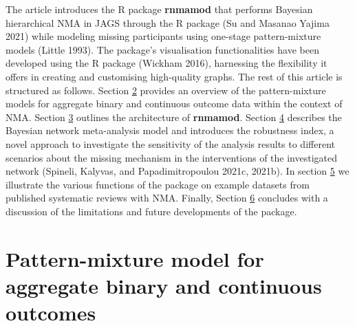 The article introduces the R package \textbf{rnmamod} that performs Bayesian
hierarchical NMA in JAGS through the R package  (Su and Masanao Yajima 2021)
while modeling missing participants using one-stage pattern-mixture models (Little 1993).
The package's visualisation functionalities have been developed using the R package
 (Wickham 2016), harnessing the flexibility it offers in creating
and customising high-quality graphs. The rest of this article is structured as
follows. Section \protect\hyperlink{Pattern-mixture-models-for-aggregate-binary-and-continuous-outcomes}{2}
provides an overview of the pattern-mixture models for aggregate binary and continuous
outcome data within the context of NMA. Section \protect\hyperlink{The-architecture-of-ux2fpkgux5cux257Brnmamodux5cux257D}{3}
outlines the architecture of \textbf{rnmamod}. Section \protect\hyperlink{Bayesian-network-meta-analysis-model}{4}
describes the Bayesian network meta-analysis model and introduces the robustness
index, a novel approach to investigate the sensitivity of the analysis results to
different scenarios about the missing mechanism in the interventions of the investigated
network (Spineli, Kalyvas, and Papadimitropoulou 2021c, 2021b).
In section \protect\hyperlink{Using-the-ux2fpkgux5cux257Brnmamodux5cux257D-R-package}{5} we illustrate the various functions of the package on example datasets from published systematic reviews with NMA. Finally, Section \protect\hyperlink{Discussion}{6}
concludes with a discussion of the limitations and future developments of the package.

\hypertarget{pattern-mixture-model-for-aggregate-binary-and-continuous-outcomes}{%
\section{Pattern-mixture model for aggregate binary and continuous outcomes}\label{pattern-mixture-model-for-aggregate-binary-and-continuous-outcomes}}

